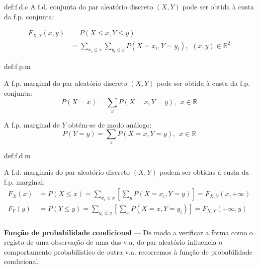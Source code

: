 \begin{theo}{def:f.d.c}\label{def:f.d.c}
    \noindent A f.d. conjunta do par aleatório discreto $(X,Y)$ pode ser obtida à custa da f.p. conjunta:

    \vspace{-2em}
    \begin{align*}
        F_{X,Y}(x,y) &= P(X \leq x, Y \leq y)\\
        &= \sum_{x_i \leq x} \sum_{y_i \leq y} P(X = x_i, Y = y_i),\,\; (x,y) \in \mathbb{R}^2
    \end{align*}

    \vspace{0.5 em}
\end{theo}

\begin{theo}{def:f.p.m}\label{def:f.p.m}

    \noindent A f.p. marginal do par aleatório discreto $(X,Y)$ pode ser obtida à custa da f.p. conjunta:
    $$
        P(X = x) = \sum_y P(X = x, Y = y),\,\; x\in \mathbb{R}
    $$

    A f.p. marginal de $Y$ obtém-se de modo análogo:
    $$
        P(Y = y) = \sum_x P(X = x, Y = y),\,\; x\in \mathbb{R}
    $$
        
    \vspace{0.5 em}
\end{theo}

\begin{theo}{def:f.d.m}\label{def:f.d.m}

    \noindent A f.d. marginais do par aleatório discreto $(X,Y)$ podem ser obtidas à custa da f.p. marginal:
    \begin{align*}
        F_X(x) &= P(X \leq x) = \sum_{x_i \leq x}\left[\sum_y P(X = x_i, Y = y)\right] = F_{X,Y}(x, +\infty)\\
        F_Y(y) &= P(Y \leq y) = \sum_{y_i \leq y}\left[\sum_x P(X = x, Y = y_i)\right] = F_{X,Y}(+\infty, y)\\
    \end{align*}
\end{theo}

\noindent\textbf{Função de probabilidade condicional} --- De modo a verificar a forma como o registo de uma observação de uma das v.a. do par aleatório influencia o comportamento probabilistico de outra v.a. recorremos à função de probabilidade condicional.

